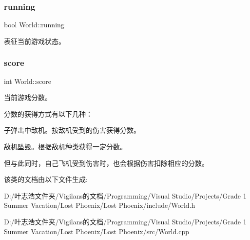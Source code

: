 \subsubsection{\texorpdfstring{running}{running}}
{\footnotesize\ttfamily bool World\+::running\hspace{0.3cm}{\ttfamily [private]}}



表征当前游戏状态。 

\mbox{\label{class_world_ae70b4ef5dd9cb9e7336169a25aaee39c}} 
\subsubsection{\texorpdfstring{score}{score}}
{\footnotesize\ttfamily int World\+::score}



当前游戏分数。 

分数的获得方式有以下几种：
\begin{DoxyEnumerate}
\item 子弹击中敌机。按敌机受到的伤害获得分数。
\item 敌机坠毁。根据敌机种类获得一定分数。
\end{DoxyEnumerate}

但与此同时，自己飞机受到伤害时，也会根据伤害扣除相应的分数。 

该类的文档由以下文件生成\+:\begin{DoxyCompactItemize}
\item 
D\+:/叶志浩文件夹/\+Vigilans的文档/\+Programming/\+Visual Studio/\+Projects/\+Grade 1 Summer Vacation/\+Lost Phoenix/\+Lost Phoenix/include/World.\+h\item 
D\+:/叶志浩文件夹/\+Vigilans的文档/\+Programming/\+Visual Studio/\+Projects/\+Grade 1 Summer Vacation/\+Lost Phoenix/\+Lost Phoenix/src/World.\+cpp\end{DoxyCompactItemize}
